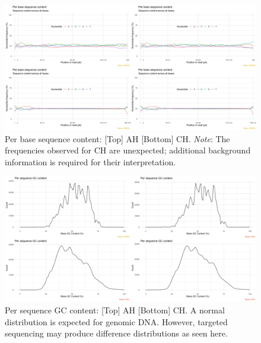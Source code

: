 \documentclass{article}
\begin{document}
\begin{figure}[h] \hspace*{0cm} 
\begin{center}
    \includegraphics[scale=0.25]{fastqcr/p3}
	\caption{Per base sequence content: [Top] AH [Bottom] CH. \textit{Note}: The frequencies observed for CH are unexpected; additional background information is required for their interpretation.}
	\label{fig:p3}
\end{center}
\end{figure}

\begin{figure}[h] \hspace*{0cm} 
\begin{center}
    \includegraphics[scale=0.25]{fastqcr/p4}
	\caption{Per sequence GC content: [Top] AH [Bottom] CH.
	A normal distribution is expected for genomic DNA. However, targeted sequencing may produce difference distributions as seen here.}
	\label{fig:p4}
\end{center}
\end{figure}
\end{document}
